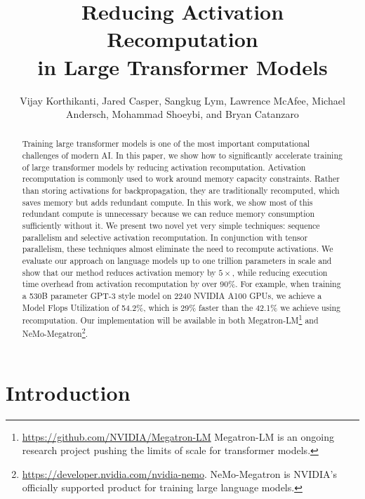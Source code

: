 \documentclass{article}
\title{Reducing Activation Recomputation \\ in Large Transformer Models}
\author{Vijay Korthikanti, Jared Casper, Sangkug Lym, Lawrence McAfee, Michael Andersch, Mohammad Shoeybi, and Bryan Catanzaro}
\affil{NVIDIA}
\date{}
\begin{document}
\maketitle


\begin{abstract}
Training large transformer models is one of the most important computational challenges of modern AI. In this paper, we show how to significantly accelerate training of large transformer models by reducing activation recomputation. Activation recomputation is commonly used to work around memory capacity constraints. Rather than storing activations for backpropagation, they are traditionally recomputed, which saves memory but adds redundant compute. In this work, we show most of this redundant compute is unnecessary because we can reduce memory consumption sufficiently without it. We present two novel yet very simple techniques: sequence parallelism and selective activation recomputation. In conjunction with tensor parallelism, these techniques almost eliminate the need to recompute activations. We evaluate our approach on language models up to one trillion parameters in scale and show that our method reduces activation memory by $5\times$, while reducing execution time overhead from activation recomputation by over 90\%. For example, when training a 530B parameter GPT-3 style model \cite{mt-nlg} on 2240 NVIDIA A100 GPUs, we achieve a Model Flops Utilization of 54.2\%, which is 29\% faster than the 42.1\% we achieve using recomputation. Our implementation will be available in both Megatron-LM\footnote{\url{https://github.com/NVIDIA/Megatron-LM} Megatron-LM is an ongoing research project pushing the limits of scale for transformer models.} and NeMo-Megatron\footnote{\url{https://developer.nvidia.com/nvidia-nemo}. NeMo-Megatron is NVIDIA's officially supported product for training large language models.}.

\end{abstract}

 
\section{Introduction}
\label{sec:intro}
\end{document}
